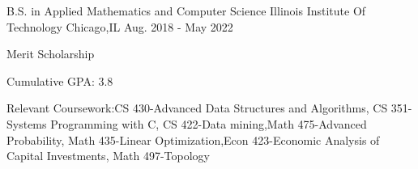 

\begin{cventries}

  \cventry
    {B.S. in Applied Mathematics and Computer Science} %
    {Illinois Institute Of Technology} %
    {Chicago,IL} %
    {Aug. 2018 - May 2022} %
    {
      \begin{cvitems} %
        \item {Merit Scholarship}
        \item {Cumulative GPA: 3.8}
        \item {Relevant Coursework:CS 430-Advanced Data Structures and Algorithms, CS 351-Systems Programming with C, CS 422-Data mining,Math 475-Advanced Probability, Math 435-Linear Optimization,Econ 423-Economic Analysis of Capital Investments, Math 497-Topology}
      \end{cvitems}
    }
    
\end{cventries}